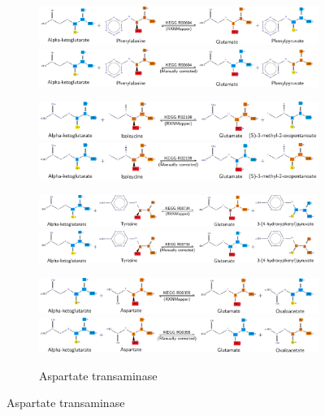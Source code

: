 \documentclass[varwidth=true]{standalone}
\begin{document}
\begin{figure}
     \begin{subfigure}[t]{1.0\textwidth}
        \caption{Phenylalanine transaminase}
        \includegraphics[width=1.0\textwidth]{phenylalanine-transaminase-incorrect.pdf}
        \includegraphics[width=1.0\textwidth]{phenylalanine-transaminase-correct.pdf}
        \caption{Isoleucine transaminase}
        \includegraphics[width=1.0\textwidth]{isoleucine-transaminase-incorrect.pdf}
        \includegraphics[width=1.0\textwidth]{isoleucine-transaminase-correct.pdf}
        \caption{Tyrosine transaminase}
        \includegraphics[width=1.0\textwidth]{tyrosine-transaminase-incorrect.pdf}
        \includegraphics[width=1.0\textwidth]{tyrosine-transaminase-correct.pdf}
        \caption{Aspartate transaminase}
        \includegraphics[width=1.0\textwidth]{aspartate-transaminase-incorrect.pdf}
        \includegraphics[width=1.0\textwidth]{aspartate-transaminase-correct.pdf}
    \end{subfigure}
\end{figure}
\end{document}
